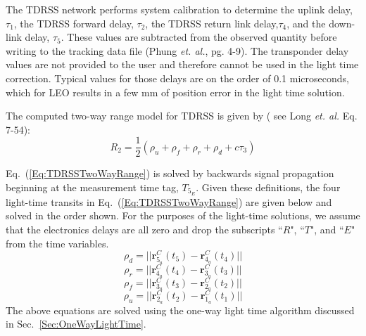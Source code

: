 The TDRSS network performs system calibration to determine  the uplink delay, $\tau_1$, the TDRSS forward delay, $\tau_2$,  the TDRSS return link delay,$\tau_4$, and the down-link delay, $\tau_5$.  These values are subtracted from the observed quantity before writing to the tracking data file (Phung \cite{Phung:80} \emph{et. al.}, pg. 4-9).  The transponder delay values are not provided to the user and therefore cannot be used in the light time correction.  Typical values for those delays are on the order of 0.1 microseconds, which for LEO results in a few mm of position error in the light time solution.

The computed two-way range model for TDRSS is given by ( see Long\cite{GTDS} \emph{et. al.} Eq. 7-54):
%
\begin{equation}
   R_2 =   \frac{1}{2}\left( \rho_u + \rho_f + \rho_r + \rho_d + c \tau_3 \right) \label{Eq:TDRSSTwoWayRange}
\end{equation}
%

Eq.~(\ref{Eq:TDRSSTwoWayRange}) is solved by backwards signal propagation beginning at the measurement time tag,  $T_{5_E}$.    Given these definitions, the four light-time transits in Eq.~(\ref{Eq:TDRSSTwoWayRange}) are given below and solved in the order shown.  For the purposes of the light-time solutions, we assume that the electronics delays are all zero and drop the subscripts ``$R$", ``$T$", and ``$E$" from the time variables.
%
 \begin{equation}
     \rho_{d} = || \mathbf{r}_{5_{a}}^C(t_{5}) - \mathbf{r}_{4_{a}}^C(t_{4}) ||
\end{equation}
%
\begin{equation}
     \rho_r = || \mathbf{r}_{4_{a}}^C(t_{4}) - \mathbf{r}_{3_{a}}^C(t_{3}) ||
\end{equation}
%
\begin{equation}
     \rho_{f} = || \mathbf{r}_{3_{a}}^C(t_{3}) - \mathbf{r}_{2_{a}}^C(t_{2}) ||
\end{equation}
%
\begin{equation}
     \rho_u = || \mathbf{r}_{2_{a}}^C(t_{2}) - \mathbf{r}_{1_{a}}^C(t_{1}) ||
\end{equation}
%
The above equations are solved using the one-way light time algorithm discussed in Sec.~\ref{Sec:OneWayLightTime}.

